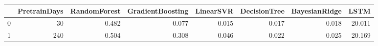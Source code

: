 \begin{tabular}{lrrrrrrr}
\toprule
{} &  PretrainDays &  RandomForest &  GradientBoosting &  LinearSVR &  DecisionTree &  BayesianRidge &    LSTM \\
\midrule
0 &            30 &         0.482 &             0.077 &      0.015 &         0.017 &          0.018 &  20.011 \\
1 &           240 &         0.504 &             0.308 &      0.046 &         0.022 &          0.025 &  20.169 \\
\bottomrule
\end{tabular}
